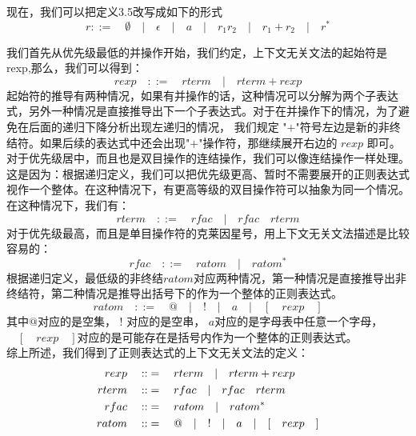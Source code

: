 \documentclass[openany,oneside]{book}
\theoremstyle{definition}
\begin{document}
	现在，我们可以把定义3.5改写成如下的形式
	\begin{equation}
		r::= \quad \emptyset \quad| \quad\epsilon\quad |\quad a \quad  |\quad r_1 r_2\quad |\quad r_1 + r_2\quad | \quad r^*
	\end{equation}
	
	我们首先从优先级最低的并操作开始，我们约定，上下文无关文法的起始符是rexp,那么，我们可以得到：
	\begin{equation}
		rexp \quad::=\quad rterm\quad  | \quad rterm + rexp
	\end{equation}
	\indent 起始符的推导有两种情况，如果有并操作的话，这种情况可以分解为两个子表达式，另外一种情况是直接推导出下一个子表达式。对于在并操作下的情况，为了避免在后面的递归下降分析出现左递归的情况， 我们规定 "$+$"符号左边是新的非终结符。如果后续的表达式中还会出现"$+$"操作符，那继续展开右边的 $rexp$ 即可。\\
	\indent 对于优先级居中，而且也是双目操作的连结操作，我们可以像连结操作一样处理。这是因为：根据递归定义，我们可以把优先级更高、暂时不需要展开的正则表达式视作一个整体。在这种情况下，有更高等级的双目操作符可以抽象为同一个情况。在这种情况下，我们有：
	\begin{equation}
		rterm\quad::=\quad rfac\quad | \quad rfac\quad rterm
	\end{equation}
	\indent 对于优先级最高，而且是单目操作符的克莱因星号，用上下文无关文法描述是比较容易的：
	\begin{equation}
		rfac\quad::=\quad ratom \quad | \quad ratom^* 
	\end{equation}
	\indent 根据递归定义，最低级的非终结$ratom$对应两种情况，第一种情况是直接推导出非终结符，第二种情况是推导出括号下的作为一个整体的正则表达式。
	\begin{equation}
		ratom\quad::=\quad @ \quad | \quad ! \quad |\quad a \quad | \quad[\quad rexp \quad]
	\end{equation}
	\indent 其中$@$对应的是空集， $!$ 对应的是空串， $a$对应的是字母表中任意一个字母， $\quad[\quad rexp \quad]$对应的是可能存在是括号内作为一个整体的正则表达式。 \\
	\indent 综上所述，我们得到了正则表达式的上下文无关文法的定义：
	\begin{equation}
		\begin{split}
			rexp \quad::&=\quad rterm\quad  | \quad rterm + rexp \hfill  \\
			rterm\quad::&=\quad rfac\quad | \quad rfac\quad rterm \hfill  \\
			rfac\quad::&=\quad ratom \quad | \quad ratom^* \hfill \\
			ratom\quad::&=\quad @ \quad | \quad ! \quad |\quad a \quad | \quad[\quad rexp \quad] \hfill 
		\end{split}
	\end{equation}
	
\end{document}
